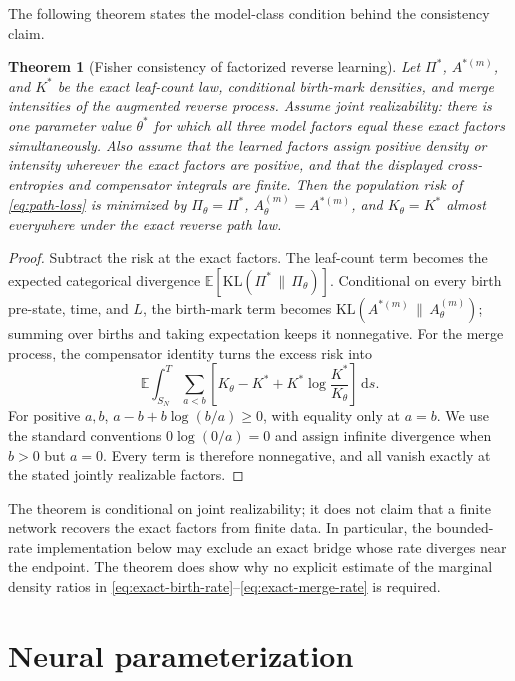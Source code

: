 \documentclass[10pt]{article}
\newtheorem{theorem}{Theorem}[section]
\theoremstyle{definition}
\theoremstyle{remark}
\newcommand{\E}{\mathbb{E}}
\newcommand{\KL}{\mathrm{KL}}
\newcommand{\dd}{\,\mathrm{d}}
\begin{document}
The following theorem states the model-class condition behind the consistency
claim.

\begin{theorem}[Fisher consistency of factorized reverse learning]
\label{thm:intensity-consistency}
Let $\Pi^*$, $A^{*(m)}$, and $K^*$ be the exact leaf-count law, conditional
birth-mark densities, and merge intensities of the augmented reverse
process.  Assume \emph{joint realizability}: there is one parameter value
$\theta^*$ for which all three model factors equal these exact factors
simultaneously.  Also assume that the learned factors assign positive
density or intensity wherever the exact factors are positive, and that the
displayed cross-entropies and compensator integrals are finite.  Then the population risk of
\eqref{eq:path-loss} is minimized by
$\Pi_\theta=\Pi^*$, $A_\theta^{(m)}=A^{*(m)}$, and $K_\theta=K^*$ almost everywhere
under the exact reverse path law.
\end{theorem}

\begin{proof}
Subtract the risk at the exact factors.  The leaf-count term becomes the
expected categorical divergence
$\E[\KL(\Pi^*\,\|\,\Pi_\theta)]$.  Conditional on every birth pre-state,
time, and $L$, the birth-mark term becomes
$\KL(A^{*(m)}\,\|\,A_\theta^{(m)})$; summing over births and taking expectation keeps it
nonnegative.  For the merge process, the compensator identity turns the
excess risk into
\begin{equation}
  \E\int_{S_N}^{T}\sum_{a<b}
  \left[
    K_\theta-K^*+K^*\log\frac{K^*}{K_\theta}
  \right]\dd s.
  \label{eq:intensity-divergence}
\end{equation}
For positive $a,b$, $a-b+b\log(b/a)\geq0$, with equality only at $a=b$.
We use the standard conventions $0\log(0/a)=0$ and assign infinite
divergence when $b>0$ but $a=0$.  Every term is therefore nonnegative, and
all vanish exactly at the stated jointly realizable factors.
\end{proof}

The theorem is conditional on joint realizability; it does not claim that a
finite network recovers the exact factors from finite data.  In particular,
the bounded-rate implementation below may exclude an exact bridge whose
rate diverges near the endpoint.  The theorem does show why no
explicit estimate of the marginal density ratios in
\eqref{eq:exact-birth-rate}--\eqref{eq:exact-merge-rate} is required.

\section{Neural parameterization}
\label{sec:parameterization}
\end{document}
